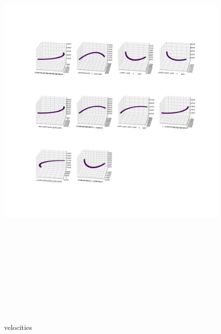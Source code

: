 \documentclass[12pt]{article}
\begin{document}
	\begin{figure}[H]
		\includegraphics[width=\linewidth, height=22cm]{subvs3Bz.png} \caption{velocities} \label{subvs3Bz}
	\end{figure}
\end{document}
